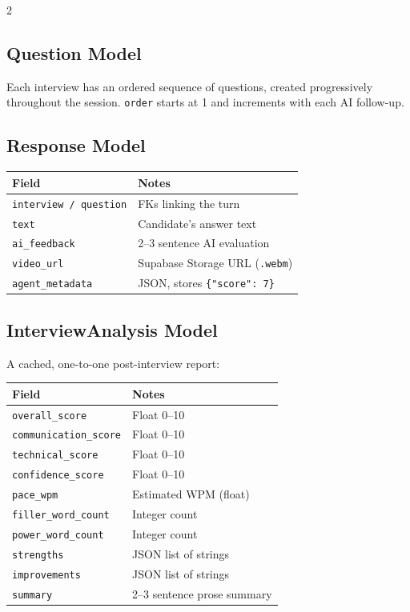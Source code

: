 \documentclass[10pt, a4paper]{article}
\begin{document}
\begin{multicols}{2}
\subsection{Question Model}
Each interview has an ordered sequence of questions, created progressively
throughout the session. \texttt{order} starts at 1 and increments with
each AI follow-up.

\subsection{Response Model}
\begin{center}
\small
\begin{tabular}{@{}ll@{}}
\toprule
Field & Notes \\
\midrule
\texttt{interview / question} & FKs linking the turn \\
\texttt{text} & Candidate's answer text \\
\texttt{ai\_feedback} & 2--3 sentence AI evaluation \\
\texttt{video\_url} & Supabase Storage URL (\texttt{.webm}) \\
\texttt{agent\_metadata} & JSON, stores \texttt{\{"score": 7\}} \\
\bottomrule
\end{tabular}
\end{center}

\subsection{InterviewAnalysis Model}
A cached, one-to-one post-interview report:
\begin{center}
\small
\begin{tabular}{@{}ll@{}}
\toprule
Field & Notes \\
\midrule
\texttt{overall\_score} & Float 0--10 \\
\texttt{communication\_score} & Float 0--10 \\
\texttt{technical\_score} & Float 0--10 \\
\texttt{confidence\_score} & Float 0--10 \\
\texttt{pace\_wpm} & Estimated WPM (float) \\
\texttt{filler\_word\_count} & Integer count \\
\texttt{power\_word\_count} & Integer count \\
\texttt{strengths} & JSON list of strings \\
\texttt{improvements} & JSON list of strings \\
\texttt{summary} & 2--3 sentence prose summary \\
\bottomrule
\end{tabular}
\end{center}


\end{multicols}
\end{document}

